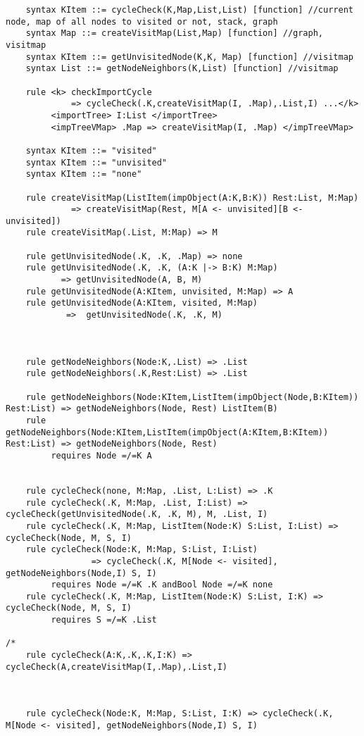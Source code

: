 \begin{lstlisting}
    syntax KItem ::= cycleCheck(K,Map,List,List) [function] //current node, map of all nodes to visited or not, stack, graph
    syntax Map ::= createVisitMap(List,Map) [function] //graph, visitmap
    syntax KItem ::= getUnvisitedNode(K,K, Map) [function] //visitmap
    syntax List ::= getNodeNeighbors(K,List) [function] //visitmap

    rule <k> checkImportCycle
             => cycleCheck(.K,createVisitMap(I, .Map),.List,I) ...</k>
         <importTree> I:List </importTree>
         <impTreeVMap> .Map => createVisitMap(I, .Map) </impTreeVMap>

    syntax KItem ::= "visited"
    syntax KItem ::= "unvisited"
    syntax KItem ::= "none"

    rule createVisitMap(ListItem(impObject(A:K,B:K)) Rest:List, M:Map) 
             => createVisitMap(Rest, M[A <- unvisited][B <- unvisited])
    rule createVisitMap(.List, M:Map) => M

    rule getUnvisitedNode(.K, .K, .Map) => none
    rule getUnvisitedNode(.K, .K, (A:K |-> B:K) M:Map)
           => getUnvisitedNode(A, B, M)
    rule getUnvisitedNode(A:KItem, unvisited, M:Map) => A
    rule getUnvisitedNode(A:KItem, visited, M:Map)
            =>  getUnvisitedNode(.K, .K, M)



    rule getNodeNeighbors(Node:K,.List) => .List
    rule getNodeNeighbors(.K,Rest:List) => .List

    rule getNodeNeighbors(Node:KItem,ListItem(impObject(Node,B:KItem)) Rest:List) => getNodeNeighbors(Node, Rest) ListItem(B)
    rule getNodeNeighbors(Node:KItem,ListItem(impObject(A:KItem,B:KItem)) Rest:List) => getNodeNeighbors(Node, Rest)
         requires Node =/=K A


    rule cycleCheck(none, M:Map, .List, L:List) => .K
    rule cycleCheck(.K, M:Map, .List, I:List) => cycleCheck(getUnvisitedNode(.K, .K, M), M, .List, I)
    rule cycleCheck(.K, M:Map, ListItem(Node:K) S:List, I:List) => cycleCheck(Node, M, S, I)
    rule cycleCheck(Node:K, M:Map, S:List, I:List)
                 => cycleCheck(.K, M[Node <- visited], getNodeNeighbors(Node,I) S, I)
         requires Node =/=K .K andBool Node =/=K none
    rule cycleCheck(.K, M:Map, ListItem(Node:K) S:List, I:K) => cycleCheck(Node, M, S, I)
         requires S =/=K .List

/*
    rule cycleCheck(A:K,.K,.K,I:K) => cycleCheck(A,createVisitMap(I,.Map),.List,I)



    rule cycleCheck(Node:K, M:Map, S:List, I:K) => cycleCheck(.K, M[Node <- visited], getNodeNeighbors(Node,I) S, I)


\end{lstlisting}
